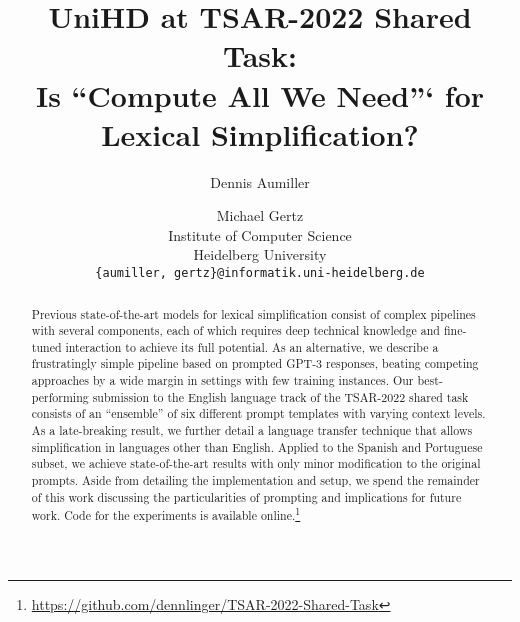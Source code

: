 \documentclass[11pt]{article}
\title{UniHD at TSAR-2022 Shared Task:\\ Is ``Compute All We Need''` for Lexical Simplification?}
\author{Dennis Aumiller \and Michael Gertz \\
  Institute of Computer Science \\
  Heidelberg University \\
  \texttt{\{aumiller, gertz\}@informatik.uni-heidelberg.de}}
\begin{document}
\maketitle
\begin{abstract}
Previous state-of-the-art models for lexical simplification consist of complex pipelines with several components, each of which requires deep technical knowledge and fine-tuned interaction to achieve its full potential.
As an alternative, we describe a frustratingly simple pipeline based on prompted GPT-3 responses, beating competing approaches by a wide margin in settings with few training instances.
Our best-performing submission to the English language track of the TSAR-2022 shared task consists of an ``ensemble'' of six different prompt templates with varying context levels. As a late-breaking result, we further detail a language transfer technique that allows simplification in languages other than English. Applied to the Spanish and Portuguese subset, we achieve state-of-the-art results with only minor modification to the original prompts.
Aside from detailing the implementation and setup, we spend the remainder of this work discussing the particularities of prompting and implications for future work.
Code for the experiments is available online.\footnote{\url{https://github.com/dennlinger/TSAR-2022-Shared-Task}}
\end{abstract}
\end{document}
